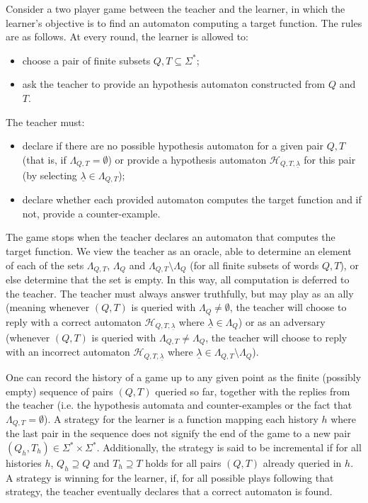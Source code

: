 \documentclass[10pt,a4paper]{amsart}
\theoremstyle{definition}
\numberwithin{equation}{section}
\numberwithin{theorem}{section}
\begin{document}
Consider a two player game between the teacher and the learner, in which the learner's objective is to find an automaton computing a target function. The rules are as follows. At every round, the learner is allowed to:
\begin{itemize}
\item choose a pair of finite subsets $Q, T \subseteq \Sigma^*$; 
\item ask the teacher to provide an hypothesis automaton constructed from $Q$ and $T$.
\end{itemize}
 The teacher must:
\begin{itemize} 
    \item declare if there are no possible hypothesis automaton for a given pair $Q,T$ (that is, if $\Lambda_{Q,T} = \emptyset$) or provide a hypothesis automaton $\mathcal{H}_{Q, T, \underline{\lambda}}$ for this pair (by selecting $\underline{\lambda} \in \Lambda_{Q, T}$); 
    \item declare whether each provided automaton computes the target function and if not, provide a counter-example.
\end{itemize}\noindent %
The game stops when the teacher declares an automaton that computes the target function.  We view the teacher as an oracle, able to determine an element of each of the sets $\Lambda_{Q, T}$, $\Lambda_{Q}$ and $\Lambda_{Q, T}\setminus\Lambda_{Q}$ (for all finite subsets of words $Q, T$), or else determine that the set is empty. In this way, all computation is deferred to the teacher. The teacher must always answer truthfully, but may play as an ally (meaning whenever $(Q,T)$ is queried with $\Lambda_{Q}\neq \emptyset$, the teacher will choose to reply with a correct automaton $\mathcal{H}_{Q, T, \underline{\lambda}}$ where $\underline{\lambda} \in \Lambda_{Q}$) or as an adversary (whenever $(Q,T)$ is queried with $\Lambda_{Q,T} \neq \Lambda_{Q}$, the teacher will choose to reply with an incorrect automaton $\mathcal{H}_{Q, T, \underline{\lambda}}$ where $\underline{\lambda} \in \Lambda_{Q,T} \setminus \Lambda_{Q}$).

One can record the history of a game up to any given point  as the finite (possibly empty) sequence of pairs $(Q,T)$ queried so far, together with the replies from the teacher (i.e. the hypothesis automata and counter-examples or the fact that $\Lambda_{Q,T} = \emptyset$). A strategy for the learner is a function mapping each history $h$ where the last pair in the sequence does not signify the end of the game to a new pair $(Q_h,T_h) \in \Sigma^* \times \Sigma^*$. Additionally, the strategy is said to be incremental if for all histories $h$, $Q_h \supseteq Q$ and $T_h \supseteq T$ holds for all pairs $(Q,T)$ already queried in $h$.     
A strategy is winning for the learner, if, for all possible plays following that strategy, the teacher eventually declares that a correct automaton is found. 
\end{document}
